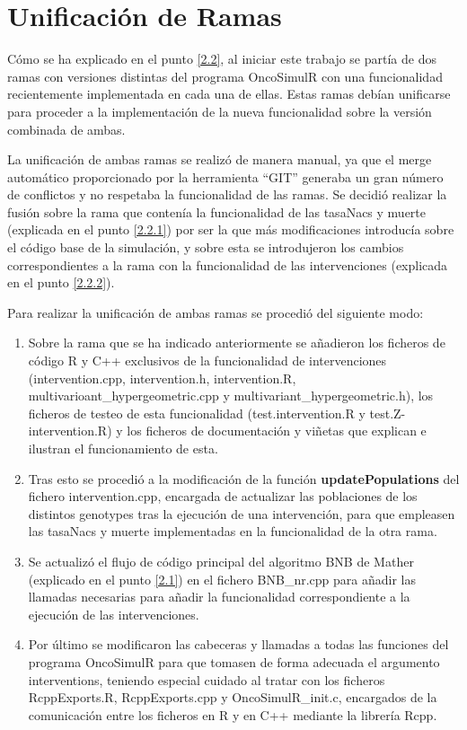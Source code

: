 \section{Unificación de Ramas}\label{4.2}

Cómo se ha explicado en el punto \ref{2.2}, al iniciar este trabajo se partía de dos ramas con versiones distintas del programa OncoSimulR\cite{OncoSimulR} con una funcionalidad recientemente implementada en cada una de ellas. Estas ramas debían unificarse para proceder a la implementación de la nueva funcionalidad sobre la versión combinada de ambas.

La unificación de ambas ramas se realizó de manera manual, ya que el merge automático proporcionado por la herramienta ``GIT'' generaba un gran número de conflictos y no respetaba la funcionalidad de las ramas. Se decidió realizar la fusión sobre la rama que contenía la funcionalidad de las \glspl{tasaNac} y muerte (explicada en el punto \ref{2.2.1}) por ser la que más modificaciones introducía sobre el código base de la simulación, y sobre esta se introdujeron los cambios correspondientes a la rama con la funcionalidad de las intervenciones (explicada en el punto \ref{2.2.2}).

Para realizar la unificación de ambas ramas se procedió del siguiente modo:
\begin{enumerate}
	\item Sobre la rama que se ha indicado anteriormente se añadieron los ficheros de código R y C++ exclusivos de la funcionalidad de intervenciones (intervention.cpp, intervention.h, intervention.R, multivarioant\_hypergeometric.cpp y multivariant\_hypergeometric.h), los ficheros de testeo de esta funcionalidad (test.intervention.R y test.Z-intervention.R) y los ficheros de documentación y viñetas que explican e ilustran el funcionamiento de esta.
	\item Tras esto se procedió a la modificación de la función \textbf{updatePopulations} del fichero intervention.cpp, encargada de actualizar las poblaciones de los distintos \glspl{genotype} tras la ejecución de una intervención, para que empleasen las \glspl{tasaNac} y muerte implementadas en la funcionalidad de la otra rama.
	\item Se actualizó el flujo de código principal del algoritmo BNB de Mather\cite{Mather} (explicado en el punto \ref{2.1}) en el fichero BNB\_nr.cpp para añadir las llamadas necesarias para añadir la funcionalidad correspondiente a la ejecución de las intervenciones.
	\item Por último se modificaron las cabeceras y llamadas a todas las funciones del programa OncoSimulR para que tomasen de forma adecuada el argumento interventions, teniendo especial cuidado al tratar con los ficheros RcppExports.R, RcppExports.cpp y OncoSimulR\_init.c, encargados de la comunicación entre los ficheros en R y en C++ mediante la librería Rcpp.
\end{enumerate}

